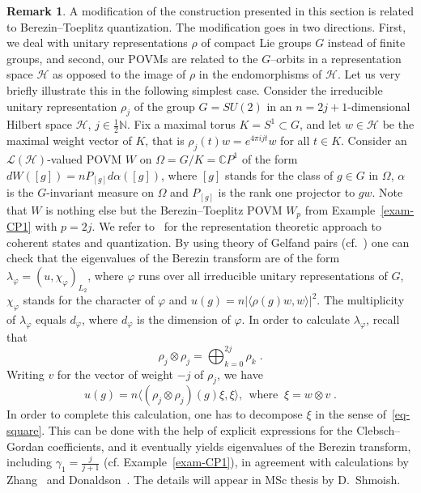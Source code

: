 \documentclass[11pt]{article}
\theoremstyle{definition}
\newtheorem{rema}[theo]{Remark}
\numberwithin{equation}{section}
\numberwithin{figure}{section}
\numberwithin{table}{section}
\newcommand{\N}{{\mathbb{N}}}
\newcommand{\CCC}{{\mathbb{C}}}
\newcommand{\Hilb}{\mathcal{H}}
\newcommand\< {\mathcal{h}}
\renewcommand\> {\mathcal{i}}
\newcommand*\cL{\mathscr{L}}
\begin{document}
\begin{rema}\label{rem-rps}
A modification of the construction presented in this section is related to Berezin--Toeplitz quantization. The modification goes in two directions. First, we deal with unitary representations $\rho$ of compact Lie groups $G$ instead of finite groups, and second, our POVMs are related to the $G$--orbits in a representation space $\Hilb$ as opposed to the image of $\rho$ in the endomorphisms of $\Hilb$. Let us very briefly illustrate this in the following simplest case. Consider the irreducible unitary representation $\rho_j$ of the group $G=SU(2)$ in an $n= 2j+1$-dimensional Hilbert space $\Hilb$, $j \in \frac{1}{2}\N$. Fix a maximal torus $K=S^1 \subset G$, and let $w \in \Hilb$ be the maximal weight vector of $K$, that is $\rho_j(t)w= e^{4\pi i j t}w$ for all $t \in K$. Consider an $\cL(\Hilb)$-valued POVM $W$ on $\Omega=G/K=\CCC P^1$ of the form $dW ([g]) = nP_{[g]}d\alpha([g])$, where $[g]$ stands for the class of $g \in G$ in $\Omega$, $\alpha$ is the $G$-invariant measure on $\Omega$ and $P_{[g]}$ is the rank one projector to $gw$. Note that $W$ is nothing else but the Berezin--Toeplitz POVM $W_{p}$ from Example~\ref{exam-CP1} with $p=2j$. We refer to~\cite[Chapter~7]{CR} for the representation theoretic approach to coherent states and quantization. By using theory of Gelfand pairs (cf.~\cite[Chapter~3.F]{Diaconis}) one can check that the eigenvalues of the Berezin transform are of the form $\lambda_\varphi = (u,\chi_\varphi)_{L_2}$, where $\varphi$ runs over all irreducible unitary representations of $G$, $\chi_\varphi$ stands for the character of $\varphi$ and $u(g)=n|\langle \rho(g) w, w\rangle|^2$. The multiplicity of $\lambda_\varphi$ equals $d_\varphi$, where $d_\varphi$ is the dimension of $\varphi$. In order to calculate $\lambda_\varphi$, recall that
\begin{equation}\label{eq-square}
\rho_j \otimes \rho_j = \bigoplus_{k=0}^{2j} \rho_k\;.
\end{equation}
Writing $v$ for the vector of weight $-j$ of $\rho_j$, we have
\[
u(g)=n \big\langle (\rho_j \otimes \rho_j) (g)\xi,\xi\big\rangle,\;\,\text{where}\;\; \xi = w\otimes v\;.
\]
In order to complete this calculation, one has to decompose $\xi$ in the sense of~\eqref{eq-square}. This can be done with the help of explicit expressions for the Clebsch--Gordan coefficients, and it eventually yields eigenvalues of the Berezin transform, including $\gamma_1=\frac{j}{j+1}$ (cf. Example~\ref{exam-CP1}), in agreement with calculations by Zhang~\cite{gap-representations} and Donaldson~\cite[p.~613]{D}. The details will appear in MSc thesis by D.~Shmoish.
\end{rema}
\end{document}
